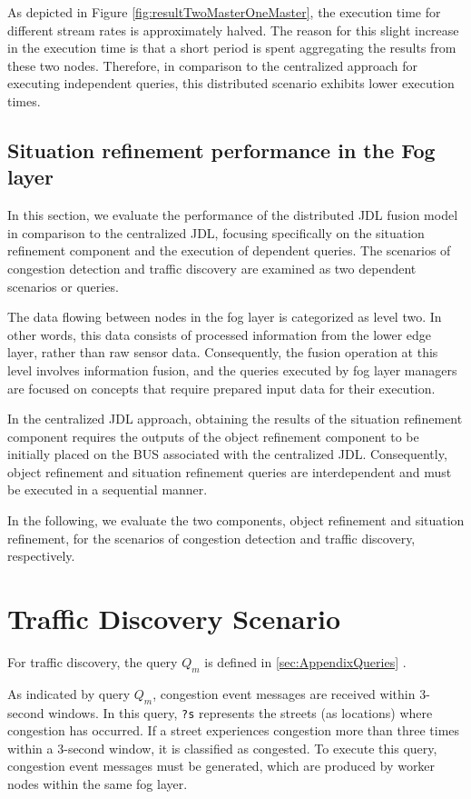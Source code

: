 \documentclass[5p,times]{elsarticle}
\begin{document}
As depicted in Figure \ref{fig:resultTwoMasterOneMaster}, the execution time for different stream rates is approximately halved. The reason for this slight increase in the execution time is that a short period is spent aggregating the results from these two nodes. Therefore, in comparison to the centralized approach for executing independent queries, this distributed scenario exhibits lower execution times.


\subsection{Situation refinement performance in the Fog layer}

In this section, we evaluate the performance of the distributed JDL fusion model in comparison to the centralized JDL, focusing specifically on the situation refinement component and the execution of dependent queries.
The scenarios of congestion detection and traffic discovery are examined as two dependent scenarios or queries.

The data flowing between nodes in the fog layer is categorized as level two. In other words, this data consists of processed information from the lower edge layer, rather than raw sensor data.  Consequently, the fusion operation at this level involves information fusion, and the queries executed by fog layer managers are focused on concepts that require prepared input data for their execution.

In the centralized JDL approach, obtaining the results of the situation refinement component requires the outputs of the object refinement component to be initially placed on the BUS associated with the centralized JDL. Consequently, object refinement and situation refinement queries are interdependent and must be executed in a sequential manner.


In the following, we evaluate the two components, object refinement and situation refinement, for the scenarios of congestion detection and traffic discovery, respectively.



\section*{Traffic Discovery Scenario}

For traffic discovery, the query \(Q_m\) is defined in \ref{sec:AppendixQueries} .

As indicated by query \(Q_m\), congestion event messages are received within 3-second windows. 
In this query, \texttt{?s} represents the streets (as locations) where congestion has occurred. If a street experiences congestion more than three times within a 3-second window, it is classified as congested. 
To execute this query, congestion event messages must be generated, which are produced by worker nodes within the same fog layer. 
\end{document}

